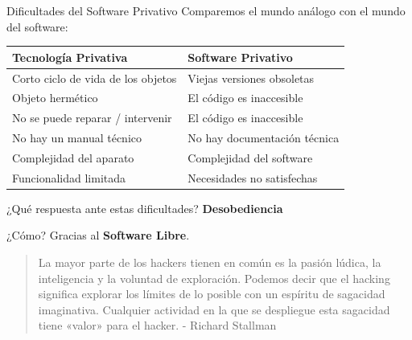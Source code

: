 \documentclass[spanish]{beamer}
\begin{document}
\begin{frame}{Dificultades del Software Privativo}
    \centering
    Comparemos el mundo análogo con el mundo del software:
    \vspace{0.6cm}

    \resizebox{11cm}{!}
    {
    \begin{tabular}{|l|l|}
        \hline        
        \rowcolor{lightgray}\textbf{Tecnología Privativa} & \textbf{Software Privativo} \\ 
        \hline
        \hline
        Corto ciclo de vida de los objetos & Viejas versiones obsoletas \\ 
        \hline
        Objeto hermético & El código es inaccesible \\
        \hline
        No se puede reparar / intervenir & El código es inaccesible \\
        \hline
        No hay un manual técnico & No hay documentación técnica \\
        \hline
        Complejidad del aparato & Complejidad del software \\
        \hline
        Funcionalidad limitada & Necesidades no satisfechas \\
        \hline
    \end{tabular}
    }
    
    \vspace{0.6cm}

    ¿Qué respuesta ante estas dificultades? \MVRightArrow{} \textbf{Desobediencia}
    
    ¿Cómo? Gracias al \textbf{Software Libre}.
\end{frame}

\begin{frame}
    \begin{quote}
        La mayor parte de los hackers tienen en común es la pasión lúdica, la inteligencia y la voluntad de exploración. Podemos decir que el hacking significa explorar los límites de lo posible con un espíritu de sagacidad imaginativa. Cualquier actividad en la que se despliegue esta sagacidad tiene «valor» para el hacker. - Richard Stallman
    \end{quote}
\end{frame}
\end{document}
